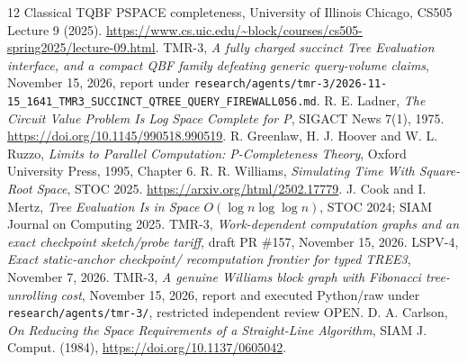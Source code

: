 \documentclass[11pt]{article}
\begin{document}
\begin{thebibliography}{12}
 Classical TQBF PSPACE completeness,
University of Illinois Chicago, CS505 Lecture 9 (2025).
\url{https://www.cs.uic.edu/~block/courses/cs505-spring2025/lecture-09.html}.
 TMR-3,
\emph{A fully charged succinct Tree Evaluation interface, and a
compact QBF family defeating generic query-volume claims},
November 15, 2026, report under
\texttt{research/agents/tmr-3/2026-11-15\_1641\_TMR3\_SUCCINCT\_QTREE\_QUERY\_FIREWALL056.md}.
 R. E. Ladner,
\emph{The Circuit Value Problem Is Log Space Complete for P},
SIGACT News 7(1), 1975. \url{https://doi.org/10.1145/990518.990519}.
 R. Greenlaw, H. J. Hoover and W. L. Ruzzo,
\emph{Limits to Parallel Computation: P-Completeness Theory},
Oxford University Press, 1995, Chapter 6.
 R. R. Williams, 
\emph{Simulating Time With Square-Root Space},
STOC 2025. \url{https://arxiv.org/html/2502.17779}.
 J. Cook and I. Mertz,
\emph{Tree Evaluation Is in Space 
$O(\log n\log\log n)$}, STOC 2024; 
SIAM Journal on Computing 2025.
 TMR-3, 
\emph{Work-dependent computation graphs and 
an exact checkpoint sketch/probe tariff},
draft PR \#157, November 15, 2026.
 LSPV-4,
\emph{Exact static-anchor checkpoint/
recomputation frontier for typed TREE3},
November 7, 2026.
 TMR-3, \emph{A genuine Williams block graph with
Fibonacci tree-unrolling cost}, November 15, 2026,
report and executed Python/raw under
\texttt{research/agents/tmr-3/}, restricted independent
review OPEN.
 D. A. Carlson,
\emph{On Reducing the Space Requirements of a Straight-Line Algorithm},
SIAM J. Comput. (1984), \url{https://doi.org/10.1137/0605042}.
\end{thebibliography}
\end{document}
